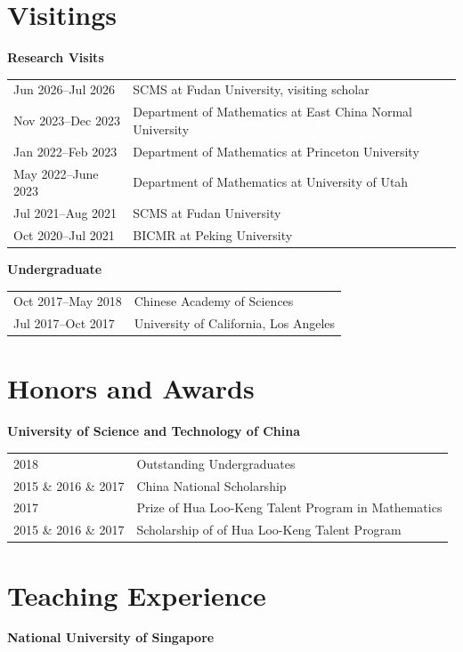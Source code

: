 \documentclass[margin,line,pifont,palatino,courier]{res}
\begin{document}
\begin{resume}
\section{\sc Visitings}

{\bf  Research Visits}

\begin{tabular}{@{}p{1.5in}p{7in}}
Jun 2026--Jul 2026& SCMS at Fudan University, visiting scholar\\
Nov 2023--Dec 2023& Department of Mathematics at East China Normal University\\
Jan 2022--Feb 2023& Department of Mathematics at Princeton University\\
May 2022--June 2023& Department of Mathematics at University of Utah\\
Jul 2021--Aug 2021& SCMS at Fudan University\\
Oct 2020--Jul 2021& BICMR at Peking University
\end{tabular}

\begin{minipage}[t]{\textwidth}
{\bf  Undergraduate}

\begin{tabular}{@{}p{1.5in}p{7in}}
Oct 2017--May 2018 & Chinese Academy of Sciences\\
Jul 2017--Oct 2017& University of California, Los Angeles
\end{tabular}
\end{minipage}

\section{\sc Honors and Awards}

{\bf  University of Science and Technology of China}

\begin{tabular}{@{}p{1.5in}p{7in}}
2018 & Outstanding Undergraduates\\
2015 \& 2016 \& 2017& China National Scholarship\\
2017 & Prize of Hua Loo-Keng Talent Program in Mathematics\\
2015 \& 2016 \& 2017& Scholarship of of Hua Loo-Keng Talent Program
\end{tabular}


\section{\sc Teaching Experience}
{\bf  National University of Singapore}



\end{resume}
\end{document}
